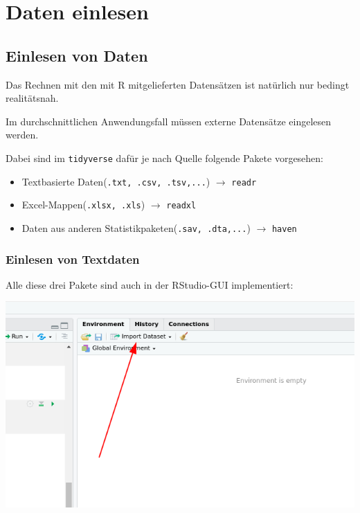 \documentclass[
]{book}
\begin{document}
\hypertarget{daten-einlesen}{%
\chapter{Daten einlesen}\label{daten-einlesen}}

\hypertarget{einlesen-von-daten}{%
\section{Einlesen von Daten}\label{einlesen-von-daten}}

Das Rechnen mit den mit R mitgelieferten Datensätzen ist natürlich nur bedingt realitätsnah.

Im durchschnittlichen Anwendungsfall müssen externe Datensätze eingelesen werden.

Dabei sind im \texttt{tidyverse} dafür je nach Quelle folgende Pakete vorgesehen:

\begin{itemize}
\item
  Textbasierte Daten(\texttt{.txt,\ .csv,\ .tsv,...}) \(\rightarrow\) \texttt{readr}
\item
  Excel-Mappen(\texttt{.xlsx,\ .xls}) \(\rightarrow\) \texttt{readxl}
\item
  Daten aus anderen Statistikpaketen(\texttt{.sav,\ .dta,...}) \(\rightarrow\) \texttt{haven}
\end{itemize}

\hypertarget{einlesen-von-textdaten}{%
\subsection{Einlesen von Textdaten}\label{einlesen-von-textdaten}}

Alle diese drei Pakete sind auch in der RStudio-GUI implementiert:

\begin{center}\includegraphics[width=0.8\linewidth]{imgs/menu} \end{center}
\end{document}
